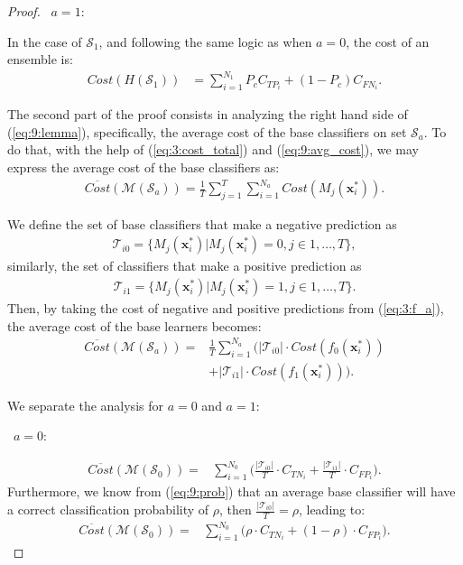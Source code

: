 {\begin{proof}
  \textbullet\ $a=1:$
  
  \noindent In the case of $\mathcal{S}_1$, and following the same logic as when $a=0$, the cost of 
  an  ensemble is:
  \begin{align}\label{eq:22}
    Cost(H(\mathcal{S}_1)) &= \sum_{i=1}^{N_1} P_c C_{TP_i} + (1-P_c)C_{FN_i}.  
  \end{align}

  \noindent The second part of the proof consists in analyzing the right hand side of 
  (\ref{eq:9:lemma}),   specifically, the average cost of the base classifiers on set 
  $\mathcal{S}_a$. To do that, with the help of (\ref{eq:3:cost_total}) and (\ref{eq:9:avg_cost}), 
  we may express the average cost of the base classifiers as:
  \begin{align}
    \overline{Cost} (\mathcal{M}(\mathcal{S}_a)) = \frac{1}{T} \sum_{j=1}^{T} \sum_{i=1}^{N_a} 
    Cost(M_j(\mathbf{x}_i^*)).  
  \end{align} 
  
  \noindent We define the set of base classifiers that make a negative prediction as
  \begin{align}
    \mathcal{T}_{i0}=\{M_j(\mathbf{x}_i^*) \vert M_j(\mathbf{x}_i^*) = 0, j \in 1,\dots,T\},
  \end{align}
  similarly, the set of classifiers that make a positive prediction as
  \begin{align}
    \mathcal{T}_{i1}=\{M_j(\mathbf{x}_i^*) \vert M_j(\mathbf{x}_i^*) = 1, j \in 1,\dots,T\}.
  \end{align}
  Then, by taking the cost of negative and positive predictions from (\ref{eq:3:f_a}), the 
  average cost of the base learners becomes:
  \begin{align}
    \overline{Cost} (\mathcal{M}(\mathcal{S}_a)) =& 
    \frac{1}{T} \sum_{i=1}^{N_a} \bigg( \vert \mathcal{T}_{i0} \vert \cdot 
    Cost(f_0(\mathbf{x}_i^*)) \nonumber \\
    & + \vert \mathcal{T}_{i1} \vert \cdot Cost(f_1(\mathbf{x}_i^*)) \bigg).
  \end{align} 

  \noindent We separate the analysis for $a=0$ and $a=1$:
  
  \textbullet\ $a=0:$
  
  \begin{align}
    \overline{Cost} (\mathcal{M}(\mathcal{S}_0)) =& \sum_{i=1}^{N_0} \bigg( 
    \frac{\vert \mathcal{T}_{i0} \vert}{T} \cdot C_{TN_i}
    + \frac{\vert \mathcal{T}_{i1} \vert}{T} \cdot C_{FP_i}\bigg).
  \end{align}
  Furthermore, we know from (\ref{eq:9:prob}) that an average base classifier will have a correct 
  classification probability of $\rho$, then $\frac{\vert \mathcal{T}_{i0} \vert}{T}=\rho$, leading 
  to:
  \begin{align}\label{eq:26}
    \overline{Cost} (\mathcal{M}(\mathcal{S}_0)) =& \sum_{i=1}^{N_0}  
    \bigg( \rho \cdot C_{TN_i} + (1-\rho) \cdot C_{FP_i} \bigg).
  \end{align}


\end{proof}}
